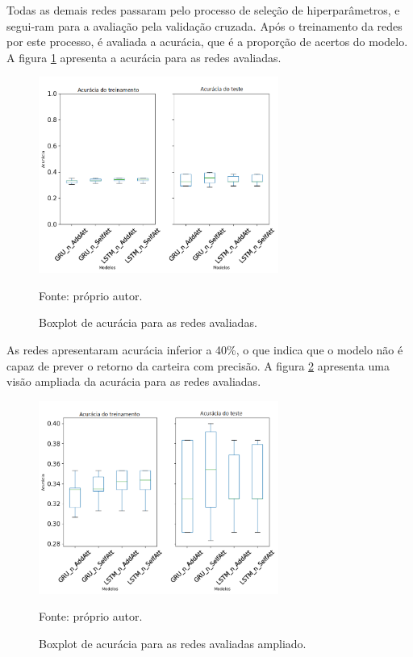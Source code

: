         \ipar Todas as demais redes passaram pelo processo de seleção de hiperparâmetros, e segui-ram para a avaliação pela validação cruzada. Após o treinamento da redes por este processo, é avaliada a acurácia, que é a proporção de acertos do modelo. A figura \ref{fig:accuracy} apresenta a acurácia para as redes avaliadas.

        \begin{figure}[H]
            \centering
            \caption{Boxplot de acurácia para as redes avaliadas.}
            \label{fig:accuracy}
            \includegraphics[width=0.7\textwidth]{./imagens/boxplot_val_01.png}
            \par \footnotesize Fonte: próprio autor.
        \end{figure}

        \ipar As redes apresentaram acurácia inferior a 40\%, o que indica que o modelo não é capaz de prever o retorno da carteira com precisão. A figura \ref{fig:boxplotval_zoom} apresenta uma visão ampliada da acurácia para as redes avaliadas.

        \begin{figure}[H]
            \centering
            \caption{Boxplot de acurácia para as redes avaliadas ampliado.}
            \label{fig:boxplotval_zoom}
            \includegraphics[width=0.7\textwidth]{./imagens/boxplotval_zoom.png}
            \par \footnotesize Fonte: próprio autor.
        \end{figure}

